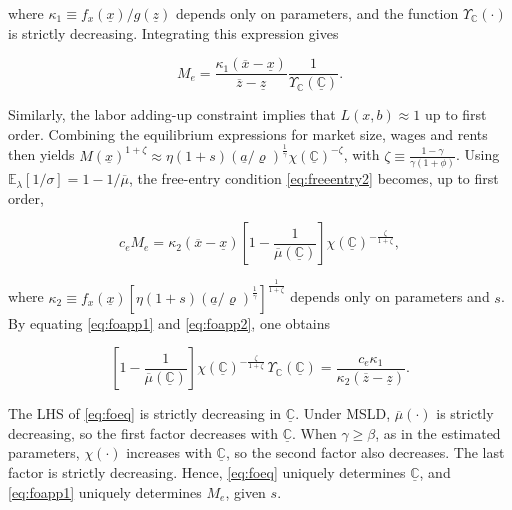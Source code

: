 where $\kappa_1 \equiv f_x(\underline{x})/g(\underline{z})$ depends only on parameters, and the function $\Upsilon_{\mathbb{C}}(\cdot)$ is strictly decreasing. Integrating this expression gives

\begin{equation}\label{eq:foapp1}
	M_e = \frac{\kappa_1 (\overline{x} - \underline{x})}{\overline{z} - \underline{z}} \frac{1}{\Upsilon_{\mathbb{C}}(\underline{\mathbb{C}})}.
\end{equation}

Similarly, the labor adding-up constraint implies that $L(x,b) \approx 1$ up to first order. Combining the equilibrium expressions for market size, wages and rents then yields $M(\underline{x})^{1+\zeta} \approx \eta (1+s) (\underline{a}/\varrho)^{\frac{1}{\gamma}} \chi(\underline{\mathbb{C}})^{-\zeta}$, with $\zeta \equiv \frac{1-\gamma}{\gamma(1+\phi)}$. Using $\mathbb{E}_\lambda[1/\sigma] = 1 - 1/\overline{\mu}$, the free-entry condition \eqref{eq:freeentry2} becomes, up to first order,

\begin{equation}\label{eq:foapp2}
	c_e M_e = \kappa_2 (\overline{x} - \underline{x}) \left[1 - \frac{1}{\overline{\mu}(\underline{\mathbb{C}})}\right] \chi(\underline{\mathbb{C}})^{-\frac{\zeta}{1+\zeta}},
\end{equation}

where $\kappa_2 \equiv f_x(\underline{x}) \left[\eta (1+s) (\underline{a}/\varrho)^{\frac{1}{\gamma}}\right]^{\frac{1}{1+\zeta}}$ depends only on parameters and $s$. By equating \eqref{eq:foapp1} and \eqref{eq:foapp2}, one obtains

\begin{equation}\label{eq:foeq}
	\left[1 - \frac{1}{\overline{\mu}(\underline{\mathbb{C}})}\right] \chi(\underline{\mathbb{C}})^{-\frac{\zeta}{1+\zeta}}\, \Upsilon_{\mathbb{C}}(\underline{\mathbb{C}}) = \frac{c_e \kappa_1}{\kappa_2 (\overline{z} - \underline{z})}.
\end{equation}

The LHS of \eqref{eq:foeq} is strictly decreasing in $\underline{\mathbb{C}}$. Under MSLD, $\overline{\mu}(\cdot)$ is strictly decreasing, so the first factor decreases with $\underline{\mathbb{C}}$. When $\gamma \geq \beta$, as in the estimated parameters, $\chi(\cdot)$ increases with $\underline{\mathbb{C}}$, so the second factor also decreases. The last factor is strictly decreasing. Hence, \eqref{eq:foeq} uniquely determines $\underline{\mathbb{C}}$, and \eqref{eq:foapp1} uniquely determines $M_e$, given $s$.

